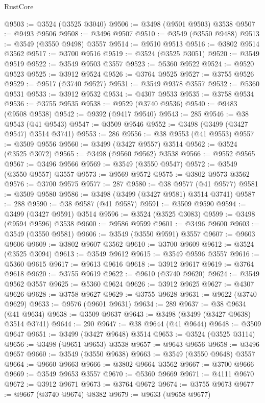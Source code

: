 \begin{lexlean}{RustCore}
\begin{coremodule}
@9503 := @3524 (@3525 @3040)
@9506 := @3498 (@9501 @9503) @3538
@9507 := @9493 @9506
@9508 := @3496 @9507
@9510 := @3549 (@3550 @9488)
@9513 := @3549 (@3550 @9498) @3557
@9514 := @9510 @9513
@9516 := @3802 @9514 @3562
@9517 := @3700 @9516
@9519 := @3524 (@3525 @3051)
@9520 := @3549 @9519
@9522 := @3549 @9503 @3557
@9523 := @5360 @9522
@9524 := @9520 @9523
@9525 := @3912 @9524
@9526 := @3764 @9525
@9527 := @3755 @9526
@9529 := @9517 (@3740 @9527)
@9531 := @3549 @9378 @3557
@9532 := @5360 @9531
@9533 := @3912 @9532
@9534 := @4307 @9533
@9535 := @3758 @9534
@9536 := @3755 @9535
@9538 := @9529 (@3740 @9536)
@9540 := @9483 (@9508 @9538)
@9542 := @9392 (@9417 @9540)
@9543 := 285
@9546 := @38 @9543 (@41 @9543)
@9547 := @3509 @9546
@9552 := @3498 (@3499 (@3427 @9547) @3514 @3741)
@9553 := 286
@9556 := @38 @9553 (@41 @9553)
@9557 := @3509 @9556
@9560 := @3499 (@3427 @9557) @3514
@9562 := @3524 (@3525 @3072)
@9565 := @3498 (@9560 @9562) @3538
@9566 := @9552 @9565
@9567 := @3496 @9566
@9569 := @3549 (@3550 @9547)
@9572 := @3549 (@3550 @9557) @3557
@9573 := @9569 @9572
@9575 := @3802 @9573 @3562
@9576 := @3700 @9575
@9577 := 287
@9580 := @38 @9577 (@41 @9577)
@9581 := @3509 @9580
@9586 := @3498 (@3499 (@3427 @9581) @3514 @3741)
@9587 := 288
@9590 := @38 @9587 (@41 @9587)
@9591 := @3509 @9590
@9594 := @3499 (@3427 @9591) @3514
@9596 := @3524 (@3525 @3083)
@9599 := @3498 (@9594 @9596) @3538
@9600 := @9586 @9599
@9601 := @3496 @9600
@9603 := @3549 (@3550 @9581)
@9606 := @3549 (@3550 @9591) @3557
@9607 := @9603 @9606
@9609 := @3802 @9607 @3562
@9610 := @3700 @9609
@9612 := @3524 (@3525 @3094)
@9613 := @3549 @9612
@9615 := @3549 @9596 @3557
@9616 := @5360 @9615
@9617 := @9613 @9616
@9618 := @3912 @9617
@9619 := @3764 @9618
@9620 := @3755 @9619
@9622 := @9610 (@3740 @9620)
@9624 := @3549 @9562 @3557
@9625 := @5360 @9624
@9626 := @3912 @9625
@9627 := @4307 @9626
@9628 := @3758 @9627
@9629 := @3755 @9628
@9631 := @9622 (@3740 @9629)
@9633 := @9576 (@9601 @9631)
@9634 := 289
@9637 := @38 @9634 (@41 @9634)
@9638 := @3509 @9637
@9643 := @3498 (@3499 (@3427 @9638) @3514 @3741)
@9644 := 290
@9647 := @38 @9644 (@41 @9644)
@9648 := @3509 @9647
@9651 := @3499 (@3427 @9648) @3514
@9653 := @3524 (@3525 @3114)
@9656 := @3498 (@9651 @9653) @3538
@9657 := @9643 @9656
@9658 := @3496 @9657
@9660 := @3549 (@3550 @9638)
@9663 := @3549 (@3550 @9648) @3557
@9664 := @9660 @9663
@9666 := @3802 @9664 @3562
@9667 := @3700 @9666
@9669 := @3549 @9653 @3557
@9670 := @5360 @9669
@9671 := @4111 @9670
@9672 := @3912 @9671
@9673 := @3764 @9672
@9674 := @3755 @9673
@9677 := @9667 (@3740 @9674) @8382
@9679 := @9633 (@9658 @9677)

\end{coremodule}
\end{lexlean}

